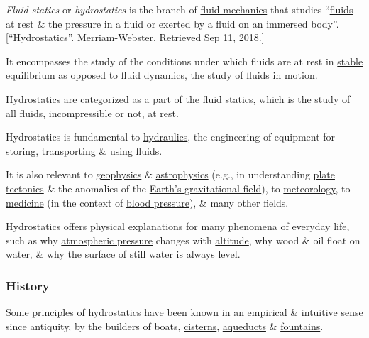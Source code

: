 \documentclass{article}
\begin{document}
%
{\it Fluid statics} or {\it hydrostatics} is the branch of \href{https://en.wikipedia.org/wiki/Fluid_mechanics}{fluid mechanics} that studies ``\href{https://en.wikipedia.org/wiki/Fluid}{fluids} at rest \& the pressure in a fluid or exerted by a fluid on an immersed body''.[``Hydrostatics''. Merriam-Webster. Retrieved Sep 11, 2018.]

%
It encompasses the study of the conditions under which fluids are at rest in \href{https://en.wikipedia.org/wiki/Mechanical_equilibrium}{stable equilibrium} as opposed to \href{https://en.wikipedia.org/wiki/Fluid_dynamics}{fluid dynamics}, the study of fluids in motion.

Hydrostatics are categorized as a part of the fluid statics, which is the study of all fluids, incompressible or not, at rest.

%
Hydrostatics is fundamental to \href{https://en.wikipedia.org/wiki/Hydraulics}{hydraulics}, the engineering of equipment for storing, transporting \& using fluids.

It is also relevant to \href{https://en.wikipedia.org/wiki/Geophysics}{geophysics} \& \href{https://en.wikipedia.org/wiki/Astrophysics}{astrophysics} (e.g., in understanding \href{https://en.wikipedia.org/wiki/Plate_tectonics}{plate tectonics} \& the anomalies of the \href{https://en.wikipedia.org/wiki/Gravity_of_Earth}{Earth's gravitational field}), to \href{https://en.wikipedia.org/wiki/Meteorology}{meteorology}, to \href{https://en.wikipedia.org/wiki/Medicine}{medicine} (in the context of \href{https://en.wikipedia.org/wiki/Blood_pressure}{blood pressure}), \& many other fields.

%
Hydrostatics offers physical explanations for many phenomena of everyday life, such as why \href{https://en.wikipedia.org/wiki/Atmospheric_pressure}{atmospheric pressure} changes with \href{https://en.wikipedia.org/wiki/Altitude}{altitude}, why wood \& oil float on water, \& why the surface of still water is always level.

\subsubsection{History}
Some principles of hydrostatics have been known in an empirical \& intuitive sense since antiquity, by the builders of boats, \href{https://en.wikipedia.org/wiki/Cistern}{cisterns}, \href{https://en.wikipedia.org/wiki/Aqueduct_(water_supply)}{aqueducts} \& \href{https://en.wikipedia.org/wiki/Fountain}{fountains}.
\end{document}
